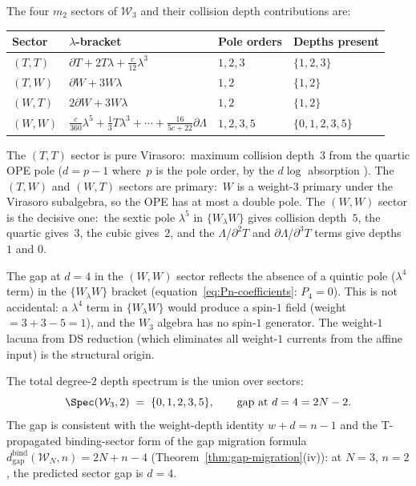 \begin{computation}
\label{comp:w3-depth-degree-2}
%
The four $m_2$ sectors of $\mathcal{W}_3$ and their collision
depth contributions are:
\begin{center}
\small
\renewcommand{\arraystretch}{1.3}
\begin{tabular}{llll}
\toprule
\textbf{Sector} & \textbf{$\lambda$-bracket}
 & \textbf{Pole orders} & \textbf{Depths present} \\
\midrule
$(T,T)$ & $\partial T + 2T\lambda + \tfrac{c}{12}\lambda^3$
 & $1, 2, 3$ & $\{1, 2, 3\}$ \\
$(T,W)$ & $\partial W + 3W\lambda$
 & $1, 2$ & $\{1, 2\}$ \\
$(W,T)$ & $2\partial W + 3W\lambda$
 & $1, 2$ & $\{1, 2\}$ \\
$(W,W)$ & $\tfrac{c}{360}\lambda^5 + \tfrac{1}{3}T\lambda^3
 + \cdots + \tfrac{16}{5c+22}\partial\Lambda$
 & $1, 2, 3, 5$ & $\{0, 1, 2, 3, 5\}$ \\
\bottomrule
\end{tabular}
\end{center}

\noindent
The $(T,T)$ sector is pure Virasoro:\ maximum collision
depth~$3$ from the quartic OPE pole ($d = p - 1$ where~$p$
is the pole order, by the $d\log$ absorption ).
The $(T,W)$ and $(W,T)$ sectors
are primary:\ $W$ is a weight-$3$ primary under the
Virasoro subalgebra, so the OPE has at most a double pole.
The $(W,W)$ sector is the decisive one:\ the sextic pole
$\lambda^5$ in $\{W_\lambda W\}$ gives collision depth~$5$,
the quartic gives~$3$, the cubic gives~$2$, and the
$\Lambda$/$\partial^2 T$ and $\partial\Lambda$/$\partial^3 T$ terms give depths $1$ and $0$.

The gap at $d = 4$ in the $(W,W)$ sector reflects the
absence of a quintic pole ($\lambda^4$ term) in the
$\{W_\lambda W\}$ bracket
(equation~\eqref{eq:Pn-coefficients}: $P_4 = 0$). This
is not accidental: a $\lambda^4$ term in $\{W_\lambda W\}$
would produce a spin-$1$ field (weight $= 3 + 3 - 5 = 1$),
and the $W_3$ algebra has no spin-$1$ generator. The
weight-$1$ lacuna from DS reduction (which eliminates all
weight-$1$ currents from the affine input) is the
structural origin.

The total degree-$2$ depth spectrum is the union over sectors:
\begin{equation}
\label{eq:w3-spec-2}
\Spec(\mathcal{W}_3, 2)
\;=\; \{0, 1, 2, 3, 5\},
\qquad
\text{gap at } d = 4 = 2N - 2.
\end{equation}
The gap is consistent with the weight-depth identity $w + d = n - 1$
and the T-propagated binding-sector form of the gap migration formula
$d_{\mathrm{gap}}^{\mathrm{bind}}(\mathcal{W}_N, n) = 2N + n - 4$
(Theorem~\ref{thm:gap-migration}(iv)): at $N = 3$, $n = 2$, the
predicted sector gap is $d = 4$.
\end{computation}


